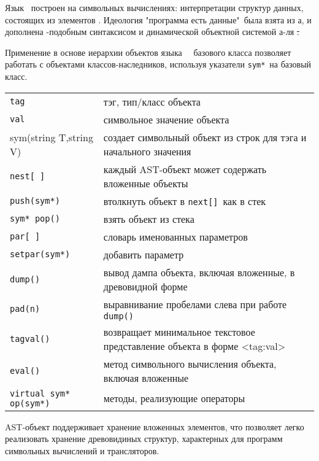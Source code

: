 \label{bisyntax}\secdown



\label{symbol}

Язык \bi\ построен на символьных вычислениях: интерпретации структур данных,
состоящих из элементов .
Идеология "программа есть данные"\ была взята из \lisp а, и дополнена
\py-подобным синтаксисом и динамической объектной системой а-ля \st.

\begin{framed}
Применение в основе иерархии объектов языка \bi\ \ базового
класса позволяет работать с объектами классов-наследников, используя указатели
\verb|sym*|\ на базовый класс. 
\end{framed}


\noindent\begin{tabular}{l l}
\verb|tag| & тэг, тип/класс объекта \\
\verb|val| & символьное значение объекта \\
sym(string T,string V) & создает символьный объект из строк для тэга
 и начального значения \\
\hline
\verb|nest[ ]| & каждый AST-объект может содержать вложенные объекты \\
\verb|push(sym*)| & втолкнуть объект в \verb|next[]|\ как в стек \\
\verb|sym* pop()| & взять объект из стека \\
\hline
\verb|par[ ]| & словарь именованных параметров \\
\verb|setpar(sym*)| & добавить параметр \\ 
\hline
\verb|dump()| & вывод дампа объекта, включая вложенные, в древовидной форме \\
\verb|pad(n)| & выравнивание пробелами слева при работе \verb|dump()| \\
\verb|tagval()| & возвращает минимальное текстовое представление 
объекта в форме <tag:val> \\
\hline
\verb|eval()| & метод символьного вычисления объекта, включая вложенные \\
\verb|virtual sym* op(sym*)| & методы, реализующие операторы \\
\end{tabular}

\bigskip
AST-объект поддерживает хранение вложенных элементов, что позволяет легко
реализовать хранение древовидиных структур, характерных для программ символьных
вычислений и трансляторов. 

